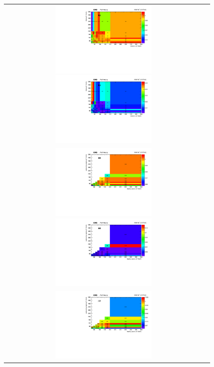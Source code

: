 \begin{figure}[h]
  \begin{center}
    \begin{tabular}{cc}
      \includegraphics[width=0.50\textwidth]{fig_2018_TrigSF/h2D_lepABpt_emu.pdf}
      \includegraphics[width=0.50\textwidth]{fig_2018_TrigSF/h2D_lepABpt_emu_BinErrors.pdf}\\       
      \includegraphics[width=0.50\textwidth]{fig_2018_TrigSF/h2D_lepABpt_ee.pdf}
      \includegraphics[width=0.50\textwidth]{fig_2018_TrigSF/h2D_lepABpt_ee_BinErrors.pdf}\\
      \includegraphics[width=0.50\textwidth]{fig_2018_TrigSF/h2D_lepABpt_mumu.pdf}

\end{tabular}
\end{center}
\end{figure}
